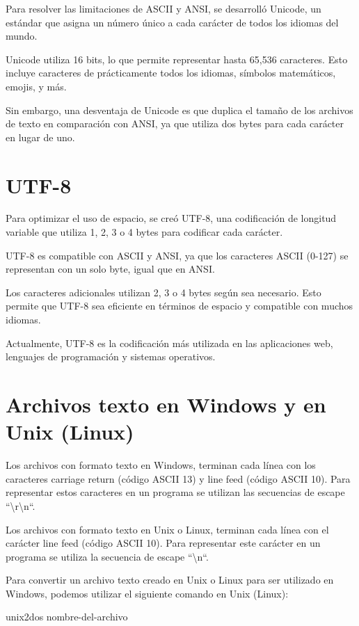 \documentclass[11pt,a4paper,oneside]{book}
\begin{document}
Para resolver las limitaciones de ASCII y ANSI, se desarrolló Unicode, un estándar que asigna un número único a cada carácter de todos los idiomas del mundo.

Unicode utiliza 16 bits, lo que permite representar hasta 65,536 caracteres. Esto incluye caracteres de prácticamente todos los idiomas, símbolos matemáticos, emojis, y más.

Sin embargo, una desventaja de Unicode es que duplica el tamaño de los archivos de texto en comparación con ANSI, ya que utiliza dos bytes para cada carácter en lugar de uno.

\section{UTF-8}

Para optimizar el uso de espacio, se creó UTF-8, una codificación de longitud variable que utiliza 1, 2, 3 o 4 bytes para codificar cada carácter.

UTF-8 es compatible con ASCII y ANSI, ya que los caracteres ASCII (0-127) se representan con un solo byte, igual que en ANSI.

Los caracteres adicionales utilizan 2, 3 o 4 bytes según sea necesario. Esto permite que UTF-8 sea eficiente en términos de espacio y compatible con muchos idiomas.

Actualmente, UTF-8 es la codificación más utilizada en las aplicaciones web, lenguajes de programación y sistemas operativos.

\section{Archivos texto en Windows y en Unix (Linux)}

Los archivos con formato texto en Windows, terminan cada línea con los caracteres carriage return (código ASCII 13) y line feed (código ASCII 10). Para representar estos caracteres en un programa se utilizan las secuencias de escape ``\textbackslash{}r\textbackslash{}n``.

Los archivos con formato texto en Unix o Linux, terminan cada línea con el carácter line feed (código ASCII 10). Para representar este carácter en un programa se utiliza la secuencia de escape ``\textbackslash{}n``.

Para convertir un archivo texto creado en Unix o Linux para ser utilizado en Windows, podemos utilizar el siguiente comando en Unix (Linux):

\begin{SourceCode}
unix2dos nombre-del-archivo
\end{SourceCode}
\end{document}
